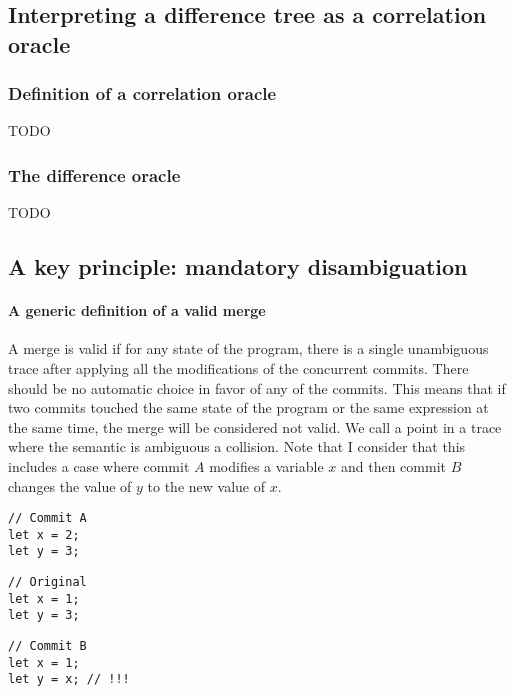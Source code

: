 \documentclass[a4paper,10pt]{article}
\begin{document}
\subsection{Interpreting a difference tree as a correlation oracle}
\subsubsection{Definition of a correlation oracle}
TODO

\subsubsection{The difference oracle}
TODO

\subsection{A key principle: mandatory disambiguation}
\paragraph{A generic definition of a valid merge} A merge is valid if for any state of the program, there is a single unambiguous trace after applying all the modifications of the concurrent commits. There should be no automatic choice in favor of any of the commits. This means that if two commits touched the same state of the program or the same expression at the same time, the merge will be considered not valid. We call a point in a trace where the semantic is ambiguous a collision.
Note that I consider that this includes a case where commit $A$ modifies a variable $x$ and then commit $B$ changes the value of $y$ to the new value of $x$.

\noindent
\begin{minipage}{.32\textwidth}
\begin{lstlisting}
// Commit A
let x = 2;
let y = 3;
\end{lstlisting}
\end{minipage}\hfill
\begin{minipage}{.32\textwidth}
\begin{lstlisting}
// Original
let x = 1;
let y = 3;
\end{lstlisting}
\end{minipage}\hfill
\begin{minipage}{.32\textwidth}
\begin{lstlisting}
// Commit B
let x = 1;
let y = x; // !!!
\end{lstlisting}
\end{minipage}
\vspace{-.4cm}
\begin{lstlisting}[label=lst:change_introducing_modified, caption={Colliding changes by using a variable modified by someone else}]
\end{lstlisting}
\end{document}
